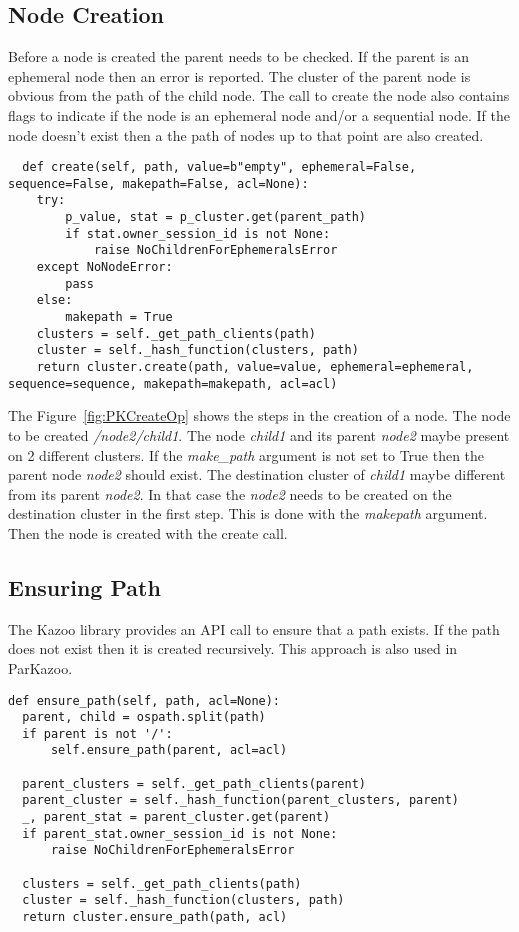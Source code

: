 

\subsection{Node Creation}
Before a node is created the parent needs to be checked. If the parent is an ephemeral node then an error is reported. The cluster of the parent node is obvious from the path of the child node. The call to create the node also contains flags to indicate if the node is an ephemeral node and/or a sequential node. If the node doesn't exist then a the path of nodes up to that point are also created.

\vspace{1.5em}


\begin{lstlisting}
  def create(self, path, value=b"empty", ephemeral=False, sequence=False, makepath=False, acl=None):
    try:
        p_value, stat = p_cluster.get(parent_path)
        if stat.owner_session_id is not None:
            raise NoChildrenForEphemeralsError
    except NoNodeError:
        pass
    else:
        makepath = True
    clusters = self._get_path_clients(path)
    cluster = self._hash_function(clusters, path)
    return cluster.create(path, value=value, ephemeral=ephemeral, sequence=sequence, makepath=makepath, acl=acl)
\end{lstlisting}

The Figure~\ref{fig:PKCreateOp} shows the steps in the creation of a node. The node to be created \textit{/node2/child1}. The node \textit{child1} and its parent \textit{node2} maybe present on 2 different clusters. If the \textit{make\_path} argument is not set to True then the parent node \textit{node2} should exist. The destination cluster of \textit{child1} maybe different from its parent \textit{node2}. In that case the \textit{node2} needs to be created on the destination cluster in the first step. This is done with the \textit{makepath} argument. Then the node is created with the create call.

\subsection{Ensuring Path}
The Kazoo library provides an API call to ensure that a path exists. If the path does not exist then it is created recursively. This approach is also used in ParKazoo.

\begin{lstlisting}
def ensure_path(self, path, acl=None):
  parent, child = ospath.split(path)
  if parent is not '/':
      self.ensure_path(parent, acl=acl)

  parent_clusters = self._get_path_clients(parent)
  parent_cluster = self._hash_function(parent_clusters, parent)
  _, parent_stat = parent_cluster.get(parent)
  if parent_stat.owner_session_id is not None:
      raise NoChildrenForEphemeralsError

  clusters = self._get_path_clients(path)
  cluster = self._hash_function(clusters, path)
  return cluster.ensure_path(path, acl)
\end{lstlisting}

